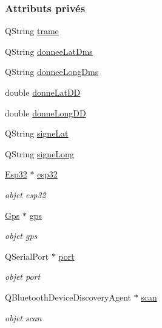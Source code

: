 \subsubsection*{Attributs privés}
\begin{DoxyCompactItemize}
\item 
Q\+String \hyperlink{class_transmission_af2e63afdc212381aa023a3bcb48148c1}{trame}
\item 
Q\+String \hyperlink{class_transmission_a82596aa40988da67b05174375d9cfadb}{donnee\+Lat\+Dms}
\item 
Q\+String \hyperlink{class_transmission_abd43fbd8ce97a99ebfd1048a9b2297cf}{donnee\+Long\+Dms}
\item 
double \hyperlink{class_transmission_a4c7537ba62aa4ffa286ef269974e9571}{donne\+Lat\+DD}
\item 
double \hyperlink{class_transmission_a285721af01428c688b33c7af80f424f5}{donne\+Long\+DD}
\item 
Q\+String \hyperlink{class_transmission_aecd312863e33ce32d811895bc143b265}{signe\+Lat}
\item 
Q\+String \hyperlink{class_transmission_a80f29bafb41f10f5be97ebaced6e684a}{signe\+Long}
\item 
\hyperlink{class_esp32}{Esp32} $\ast$ \hyperlink{class_transmission_a06ec58d6f8fa4adff82f5b2ab911c461}{esp32}
\begin{DoxyCompactList}\small\item\em objet esp32 \end{DoxyCompactList}\item 
\hyperlink{class_gps}{Gps} $\ast$ \hyperlink{class_transmission_aebadfef439f114cb09e57ddb2e3188dc}{gps}
\begin{DoxyCompactList}\small\item\em objet gps \end{DoxyCompactList}\item 
Q\+Serial\+Port $\ast$ \hyperlink{class_transmission_a0ec8a06c44492c9b4f395e7c3b1e57b9}{port}
\begin{DoxyCompactList}\small\item\em objet port \end{DoxyCompactList}\item 
Q\+Bluetooth\+Device\+Discovery\+Agent $\ast$ \hyperlink{class_transmission_a70e442ca9125041564f79c40230ecd08}{scan}
\begin{DoxyCompactList}\small\item\em objet scan \end{DoxyCompactList}\item 

\end{DoxyCompactItemize}
